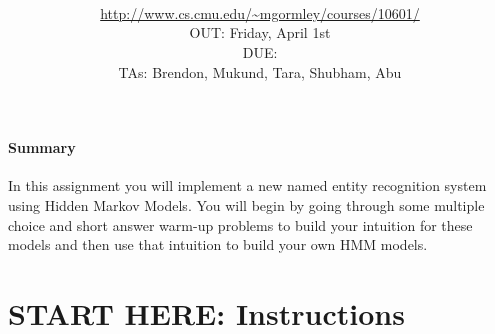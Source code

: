 \documentclass[11pt,addpoints,answers]{exam}
\title{\textsc{\hwName}
} %
\author{\courseName\\
\url{http://www.cs.cmu.edu/~mgormley/courses/10601/} \\
OUT: Friday, April 1st \\
DUE: \dueDate{} \\ 
TAs: Brendon, Mukund, Tara, Shubham, Abu
}
\date{}
\date{}
\begin{document}
\maketitle

\begin{notebox}
\paragraph{Summary} In this assignment you will implement a new named entity recognition system using Hidden Markov Models. You will begin by going through some multiple choice and short answer warm-up problems to build your intuition for these models and then use that intuition to build your own HMM models.
\end{notebox}\newcommand \maxsubs {10 }
\section*{START HERE: Instructions}
\end{document}

